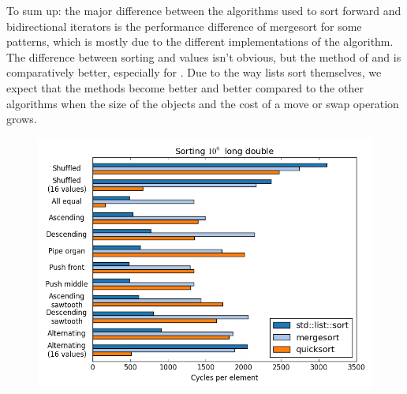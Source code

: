 \documentclass{isocpp_proposal}
\begin{document}
\begin{appendices}
To sum up: the major difference between the algorithms used to sort forward and bidirectional iterators is the performance difference of mergesort for some patterns, which is mostly due to the different implementations of the algorithm. The difference between sorting  and  values isn't obvious, but the  method of  and  is comparatively better, especially for . Due to the way lists sort themselves, we expect that the  methods become better and better compared to the other algorithms when the size of the objects and the cost of a move or swap operation grows.

\begin{figure}[h]
\includegraphics[width=\textwidth]{list-long-double.png}
\end{figure}


\end{appendices}

\newpage


\end{document}
